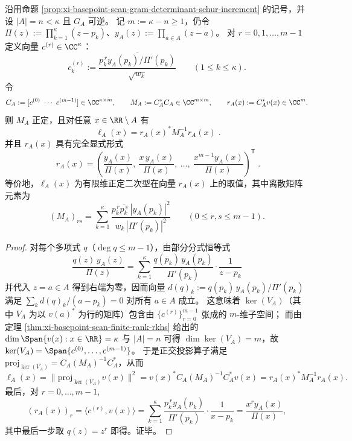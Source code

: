 \begin{theorem}\label{thm:xi-basepoint-scan-leverage-gap-general-codim-matrix}
沿用命题 \ref{prop:xi-basepoint-scan-gram-determinant-schur-increment} 的记号，并设 \(|A|=n<\kappa\) 且 \(G_A\) 可逆。
记 \(m:=\kappa-n\ge 1\)，仍令 \(\Pi(z):=\prod_{k=1}^{\kappa}(z-p_k)\)、\(y_A(z):=\prod_{a\in A}(z-a)\)。
对 \(r=0,1,\dots,m-1\) 定义向量 \(c^{(r)}\in\CC^\kappa\)：
\[
c^{(r)}_k:=\frac{\overline{p_k^{\,r}y_A(p_k)/\Pi'(p_k)}}{\sqrt{w_k}}
\qquad(1\le k\le\kappa).
\]
令
\[
C_A:=[c^{(0)}\ \cdots\ c^{(m-1)}]\in\CC^{\kappa\times m},
\qquad
M_A:=C_A^\ast C_A\in\CC^{m\times m},
\qquad
r_A(x):=C_A^\ast v(x)\in\CC^{m}.
\]
则 \(M_A\) 正定，且对任意 \(x\in\RR\setminus A\) 有
\[
\boxed{\;
\ell_A(x)=r_A(x)^\ast M_A^{-1}r_A(x)\; }.
\]
并且 \(r_A(x)\) 具有完全显式形式
\[
\boxed{\;
r_A(x)
=\left(\frac{y_A(x)}{\Pi(x)},\ \frac{x\,y_A(x)}{\Pi(x)},\ \dots,\ \frac{x^{m-1}y_A(x)}{\Pi(x)}\right)^{\mathsf T}\; }.
\]
等价地，\(\ell_A(x)\) 为有限维正定二次型在向量 \(r_A(x)\) 上的取值，其中离散矩阵元素为
\[
(M_A)_{rs}
=\sum_{k=1}^{\kappa}\frac{p_k^{\,r}\overline{p_k^{\,s}}\ |y_A(p_k)|^2}{w_k\,|\Pi'(p_k)|^2}
\qquad(0\le r,s\le m-1).
\]
\end{theorem}
\begin{proof}
对每个多项式 \(q\)（\(\deg q\le m-1\)），由部分分式恒等式
\[
\frac{q(z)\,y_A(z)}{\Pi(z)}
=\sum_{k=1}^{\kappa}\frac{q(p_k)\,y_A(p_k)}{\Pi'(p_k)}\cdot\frac{1}{z-p_k}
\]
并代入 \(z=a\in A\) 得到右端为零，因而向量
\(
d(q)_k:=q(p_k)\,y_A(p_k)/\Pi'(p_k)
\)
满足 \(\sum_k d(q)_k/(a-p_k)=0\) 对所有 \(a\in A\) 成立。
这意味着 \(\ker(V_A)\)（其中 \(V_A\) 为以 \(v(a)^\ast\) 为行的矩阵）包含由 \(\{c^{(r)}\}_{r=0}^{m-1}\) 张成的 \(m\)-维子空间；
而由定理 \ref{thm:xi-basepoint-scan-finite-rank-rkhs} 给出的 \(\dim\Span\{v(x):x\in\RR\}=\kappa\) 与 \(|A|=n\) 可得 \(\dim\ker(V_A)=m\)，故
\(\ker(V_A)=\Span\{c^{(0)},\dots,c^{(m-1)}\}\)。
于是正交投影算子满足
\(
\mathrm{proj}_{\ker(V_A)}=C_A(M_A)^{-1}C_A^\ast
\)，从而
\[
\ell_A(x)
=\|\mathrm{proj}_{\ker(V_A)}v(x)\|^2
=v(x)^\ast C_A(M_A)^{-1}C_A^\ast v(x)
=r_A(x)^\ast M_A^{-1}r_A(x).
\]
最后，对 \(r=0,\dots,m-1\),
\[
(r_A(x))_r
=\langle c^{(r)},v(x)\rangle
=\sum_{k=1}^{\kappa}\frac{p_k^{\,r}y_A(p_k)}{\Pi'(p_k)}\cdot\frac{1}{x-p_k}
=\frac{x^r y_A(x)}{\Pi(x)},
\]
其中最后一步取 \(q(z)=z^r\) 即得。证毕。
\end{proof}

